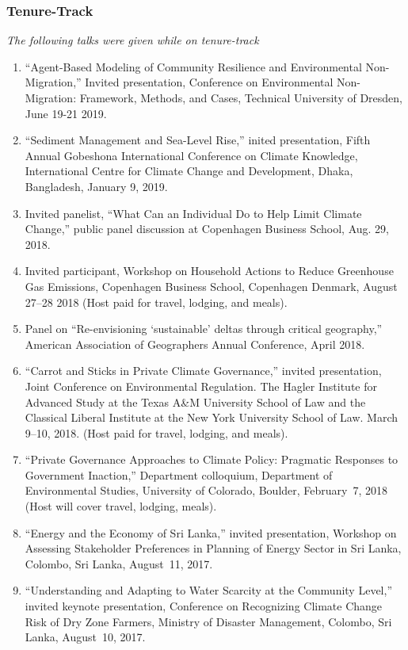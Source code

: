 %
%
\subsubsection{Tenure-Track}
\emph{The following talks were given while on tenure-track}
\begin{enumerate}
\item ``Agent-Based Modeling of Community Resilience and Environmental Non-Migration,'' Invited presentation, Conference on Environmental Non-Migration: Framework, Methods, and Cases, Technical University of Dresden, June 19-21 2019.
\item ``Sediment Management and Sea-Level Rise,'' inited presentation, Fifth Annual Gobeshona International Conference on Climate Knowledge, International Centre for Climate Change and Development, Dhaka, Bangladesh, January 9, 2019.
\item Invited panelist, ``What Can an Individual Do to Help Limit Climate Change,'' public panel discussion at Copenhagen Business School, Aug. 29, 2018.
\item Invited participant, Workshop on Household Actions to Reduce Greenhouse Gas Emissions, Copenhagen Business School, Copenhagen Denmark, August 27--28 2018 (Host paid for travel, lodging, and meals).
\item Panel on ``Re-envisioning `sustainable' deltas through critical geography,'' American Association of Geographers Annual Conference, April 2018.
\item ``Carrot and Sticks in Private Climate Governance,'' invited presentation, Joint Conference on Environmental Regulation. The Hagler Institute for Advanced Study at the Texas A\&M University School of Law and the Classical Liberal Institute at the New York University School of Law. March 9--10, 2018. (Host paid for travel, lodging, and meals).
\item ``Private Governance Approaches to Climate Policy: Pragmatic Responses to Government Inaction,'' Department colloquium, Department of Environmental Studies, University of Colorado, Boulder, February~7, 2018 (Host will cover travel, lodging, meals).
\item ``Energy and the Economy of Sri Lanka,'' invited presentation, Workshop on Assessing Stakeholder Preferences in Planning of Energy Sector in Sri Lanka, Colombo, Sri Lanka, August~11, 2017.
\item ``Understanding and Adapting to Water Scarcity at the Community Level,'' invited keynote presentation, Conference on Recognizing Climate Change Risk of Dry Zone Farmers, Ministry of Disaster Management, Colombo, Sri Lanka, August~10, 2017.

\end{enumerate}

